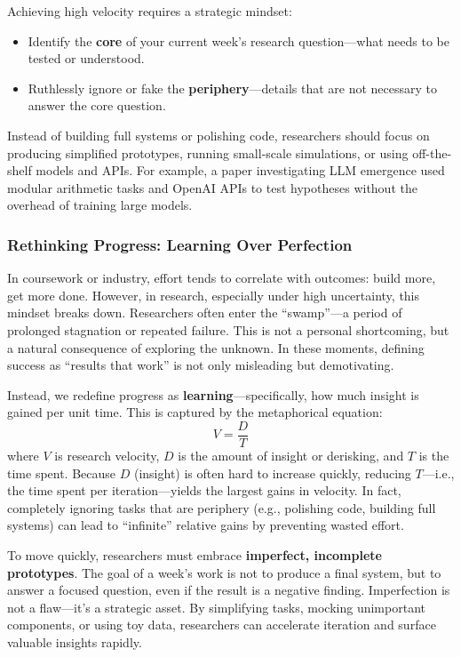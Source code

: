 Achieving high velocity requires a strategic mindset:
\begin{itemize}
    \item Identify the \textbf{core} of your current week's research question---what needs to be tested or understood.
    \item Ruthlessly ignore or fake the \textbf{periphery}---details that are not necessary to answer the core question.
\end{itemize}

Instead of building full systems or polishing code, researchers should focus on producing simplified prototypes, running small-scale simulations, or using off-the-shelf models and APIs.
For example, a paper investigating LLM emergence used modular arithmetic tasks and OpenAI APIs to test hypotheses without the overhead of training large models.

\subsubsection*{Rethinking Progress: Learning Over Perfection}

In coursework or industry, effort tends to correlate with outcomes: build more, get more done.
However, in research, especially under high uncertainty, this mindset breaks down.
Researchers often enter the ``swamp''---a period of prolonged stagnation or repeated failure.
This is not a personal shortcoming, but a natural consequence of exploring the unknown.
In these moments, defining success as ``results that work'' is not only misleading but demotivating.

Instead, we redefine progress as \textbf{learning}---specifically, how much insight is gained per unit time.
This is captured by the metaphorical equation:
\[
V = \frac{D}{T}
\]
where $V$ is research velocity, $D$ is the amount of insight or derisking, and $T$ is the time spent.
Because $D$ (insight) is often hard to increase quickly, reducing $T$---i.e., the time spent per iteration---yields the largest gains in velocity.
In fact, completely ignoring tasks that are periphery (e.g., polishing code, building full systems) can lead to ``infinite'' relative gains by preventing wasted effort.

To move quickly, researchers must embrace \textbf{imperfect, incomplete prototypes}.
The goal of a week's work is not to produce a final system, but to answer a focused question, even if the result is a negative finding.
Imperfection is not a flaw---it's a strategic asset.
By simplifying tasks, mocking unimportant components, or using toy data, researchers can accelerate iteration and surface valuable insights rapidly.


